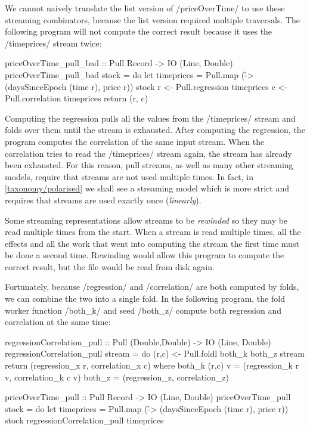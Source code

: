 We cannot naively translate the list version of \Hs/priceOverTime/ to use these streaming combinators, because the list version required multiple traversals.
The following program will not compute the correct result because it uses the \Hs/timeprices/ stream twice:

\begin{haskell}
priceOverTime_pull_bad :: Pull Record -> IO (Line, Double)
priceOverTime_pull_bad stock = do
  let timeprices = Pull.map (\r -> (daysSinceEpoch (time r), price r)) stock
  r <- Pull.regression  timeprices
  c <- Pull.correlation timeprices
  return (r, c)
\end{haskell}

Computing the regression pulls all the values from the \Hs/timeprices/ stream and folds over them until the stream is exhausted.
After computing the regression, the program computes the correlation of the same input stream.
When the correlation tries to read the \Hs/timeprices/ stream again, the stream has already been exhausted.
For this reason, pull streams, as well as many other streaming models, require that streams are not used multiple times.
In fact, in \cref{taxonomy/polarised} we shall see a streaming model which is more strict and requires that streams are used exactly once (\emph{linearly}).

Some streaming representations allow streams to be \emph{rewinded} so they may be read multiple times from the start.
When a stream is read multiple times, all the effects and all the work that went into computing the stream the first time must be done a second time.
Rewinding would allow this program to compute the correct result, but the file would be read from disk again.

Fortunately, because \Hs/regression/ and \Hs/correlation/ are both computed by folds, we can combine the two into a single fold.
In the following program, the fold worker function \Hs/both_k/ and seed \Hs/both_z/ compute both regression and correlation at the same time:

\begin{haskell}
regressionCorrelation_pull :: Pull (Double,Double) -> IO (Line, Double)
regressionCorrelation_pull stream = do
  (r,c) <- Pull.foldl both_k both_z stream
  return (regression_x r, correlation_x c)
 where
  both_k (r,c) v = (regression_k r v, correlation_k c v)
  both_z         = (regression_z,     correlation_z)

priceOverTime_pull :: Pull Record -> IO (Line, Double)
priceOverTime_pull stock = do
  let timeprices = Pull.map (\r -> (daysSinceEpoch (time r), price r)) stock
  regressionCorrelation_pull timeprices
\end{haskell}

